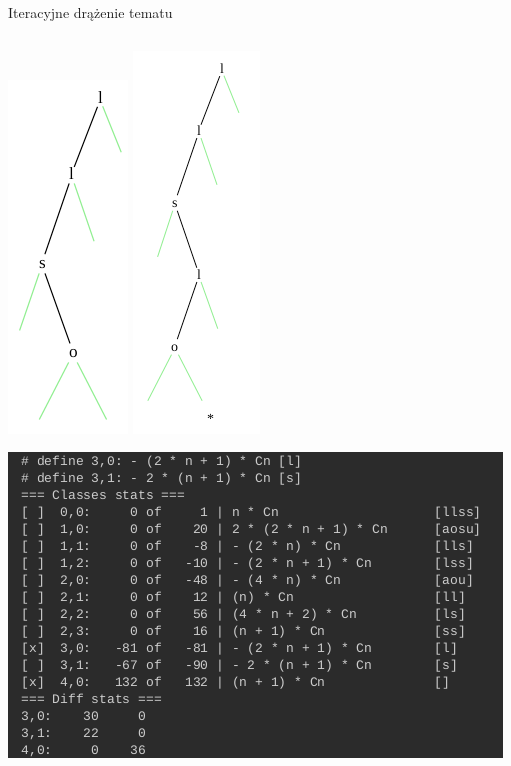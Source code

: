 \documentclass[final]{beamer}
\theoremstyle{bluetheorem}
\theoremstyle{bluetheorem}
\theoremstyle{greentheorem}
\begin{document}
\begin{frame}{Iteracyjne drążenie tematu}
\begin{columns}
        \begin{block}{}
            \begin{center}
                \includegraphics[height=.6\textwidth]{example_004.png}
                \raisebox{.3\textwidth}{$\rightarrow$}
                \includegraphics[height=.6\textwidth]{example_003.png}

                \includegraphics[width=\textwidth]{framework_005.png}
            \end{center}
        \end{block}
    \end{columns}
\end{frame}
\end{document}
